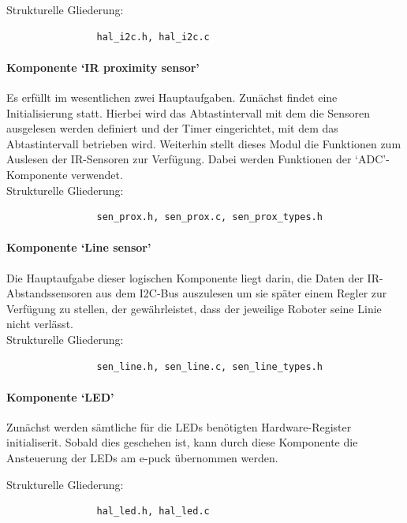 \documentclass[10pt,a4paper]{article}
\begin{document}
			Strukturelle Gliederung:
				\begin{verbatim}  
				hal_i2c.h, hal_i2c.c
				\end{verbatim}
			
			\paragraph*{Komponente `IR proximity sensor'}
			Es erfüllt im wesentlichen zwei Hauptaufgaben.
			Zunächst findet eine Initialisierung statt. Hierbei wird das Abtastintervall mit dem die Sensoren ausgelesen werden definiert und der 
			Timer eingerichtet, mit dem das Abtastintervall betrieben wird.
			Weiterhin stellt dieses Modul die Funktionen zum Auslesen der IR-Sensoren zur Verfügung. Dabei werden Funktionen der `ADC'-Komponente 		
			verwendet. \\
			
			Strukturelle Gliederung:
				\begin{verbatim}  
				sen_prox.h, sen_prox.c, sen_prox_types.h
				\end{verbatim}
			
			\paragraph*{Komponente `Line sensor'}
			Die Hauptaufgabe dieser logischen Komponente liegt darin, die Daten der IR-Abstandssensoren aus dem I2C-Bus auszulesen um sie später 
			einem Regler zur Verfügung zu stellen, der gewährleistet, dass der jeweilige Roboter seine Linie nicht verlässt. \\
			
			Strukturelle Gliederung:
				\begin{verbatim}  
				sen_line.h, sen_line.c, sen_line_types.h
				\end{verbatim}
			
			\paragraph*{Komponente `LED'}
			Zunächst werden sämtliche für die LEDs benötigten Hardware-Register initialiserit. Sobald dies geschehen ist, kann durch diese Komponente 
			die Ansteuerung der LEDs am e-puck übernommen werden.
			
			Strukturelle Gliederung:
				\begin{verbatim}  
				hal_led.h, hal_led.c
				\end{verbatim}
				
\end{document}
